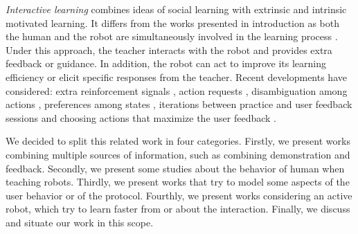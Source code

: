 
\emph{Interactive learning} combines ideas of social learning with extrinsic and intrinsic motivated learning. It differs from the works presented in introduction as both the human and the robot are simultaneously involved in the learning process \cite{kaplan2002robotic,nicolescu2003natural,breazeal2004tutelage,thomaz2008teachable}. Under this approach, the teacher interacts with the robot and provides extra feedback or guidance. In addition, the robot can act to improve its learning efficiency or elicit specific responses from the teacher. Recent developments have considered: extra reinforcement signals \cite{thomaz2008teachable}, action requests \cite{macl09airl}, disambiguation among actions \cite{chernova09jair}, preferences among states \cite{Mason2011}, iterations between practice and user feedback sessions \cite{judah2010reinforcement} and choosing actions that maximize the user feedback \cite{knox2009interactively}.

We decided to split this related work in four categories. Firstly, we present works combining multiple sources of information, such as combining demonstration and feedback. Secondly, we present some studies about the behavior of human when teaching robots. Thirdly, we present works that try to model some aspects of the user behavior or of the protocol. Fourthly, we present works considering an active robot, which try to learn faster from or about the interaction. Finally, we discuss and situate our work in this scope.



